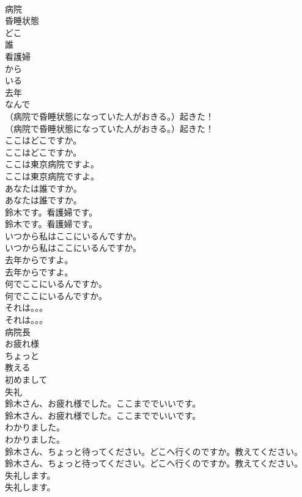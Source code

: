 \documentclass[8pt]{extreport}
\begin{document}
\begin{CJK}{UTF8}{min}
\\	病院
\\	昏睡状態
\\	どこ
\\	誰
\\	看護婦
\\	から
\\	いる
\\	去年
\\	なんで
\\	（病院で昏睡状態になっていた人がおきる。）起きた！	
\\	（病院で昏睡状態になっていた人がおきる。）起きた！ 
\\	ここはどこですか。	
\\	ここはどこですか。 
\\	ここは東京病院ですよ。	
\\	ここは東京病院ですよ。 
\\	あなたは誰ですか。	
\\	あなたは誰ですか。 
\\	鈴木です。看護婦です。	
\\	鈴木です。看護婦です。 
\\	いつから私はここにいるんですか。	
\\	いつから私はここにいるんですか。 
\\	去年からですよ。	
\\	去年からですよ。 
\\	何でここにいるんですか。	
\\	何でここにいるんですか。 
\\	それは。。。	
\\	それは。。。 
\\	病院長
\\	お疲れ様
\\	ちょっと
\\	教える
\\	初めまして
\\	失礼
\\	鈴木さん、お疲れ様でした。ここまででいいです。	
\\	鈴木さん、お疲れ様でした。ここまででいいです。 
\\	わかりました。	
\\	わかりました。 
\\	鈴木さん、ちょっと待ってください。どこへ行くのですか。教えてください。	
\\	鈴木さん、ちょっと待ってください。どこへ行くのですか。教えてください。 
\\	失礼します。	
\\	失礼します。 

\end{CJK}
\end{document}
